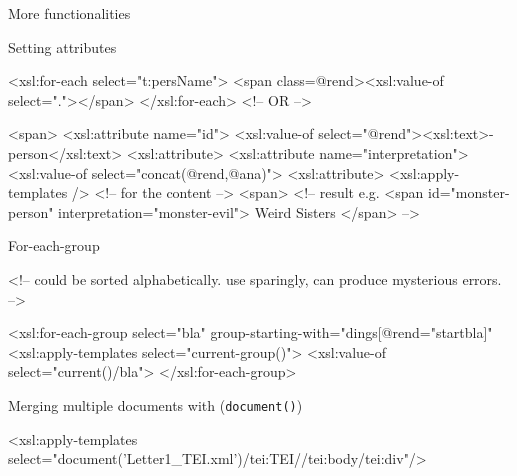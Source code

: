 \begin{frame}{More functionalities}
\framebreak

\begin{block}{Setting attributes}
\begin{xmlcode}
<xsl:for-each select="t:persName">
    <span class={@rend}><xsl:value-of select="."></span>
</xsl:for-each>
<!-- OR -->

<span>
    <xsl:attribute name="id">
        <xsl:value-of select="@rend"><xsl:text>-person</xsl:text>
    <xsl:attribute>
    <xsl:attribute name="interpretation">
        <xsl:value-of select="concat(@rend,@ana)">
    <xsl:attribute>
    <xsl:apply-templates /> <!-- for the content -->
<span>
<!-- result e.g. 
    <span id="monster-person" interpretation="monster-evil">
    Weird Sisters </span> -->
\end{xmlcode}
\end{block}

\begin{block}{For-each-group}
\begin{xmlcode}

<!-- could be sorted alphabetically.
     use sparingly, can produce mysterious errors. -->

<xsl:for-each-group select="bla" 
  group-starting-with="dings[@rend="startbla]"
    <xsl:apply-templates select="current-group()">
    <xsl:value-of select="current()/bla">
</xsl:for-each-group>

\end{xmlcode}
\end{block}

\begin{block}{Merging multiple documents with (\texttt{document()})}
\begin{xmlcode}
<xsl:apply-templates 
  select="document('Letter1_TEI.xml')/tei:TEI//tei:body/tei:div"/>
\end{xmlcode}
\end{block}
\end{frame}

